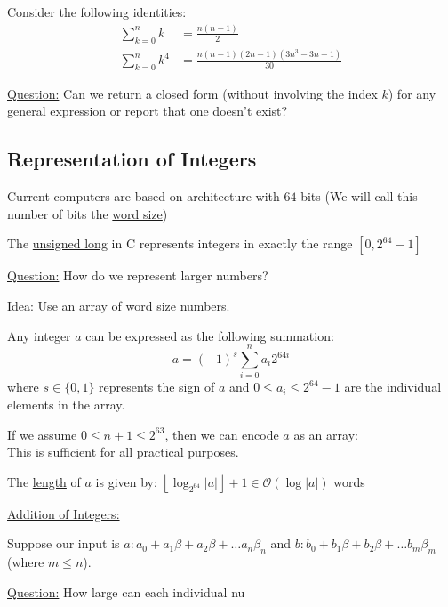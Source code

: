 \begin{example}
    Consider the following identities:
    \begin{align}
        \sum_{k = 0}^n k &= \frac{n(n-1)}{2} \\
        \sum_{k = 0}^n k^4 &= \frac{n(n-1)(2n - 1)(3n^3 - 3n - 1)}{30}
    \end{align}

    \underline{Question:} Can we return a closed form (without involving the index $k$) for any general expression or report that one doesn't exist? 
\end{example}


\subsection{Representation of Integers}
Current computers are based on architecture with $64$ bits (We will call this number of bits the \underline{word size})

\begin{example}
    The \underline{unsigned long} in C represents integers in exactly the range $[0, 2^{64} - 1]$
\end{example}

\underline{Question:} How do we represent larger numbers?

\underline{Idea:} Use an array of word size numbers.

Any integer $a$ can be expressed as the following summation:
\begin{equation}
    a = (-1)^s \sum_{i = 0}^n a_i 2^{64i}
\end{equation}
where $s \in \{0,1\}$ represents the sign of $a$ and $0 \leq a_i \leq 2^{64} - 1$ are the individual elements in the array.

If we assume $0 \leq n + 1 \leq 2^{63}$, then we can encode $a$ as an array:
\begin{equation}
    [s \cdot 2^{63} + n + 1, a_0, a_1, \ldots, a_n]
\end{equation}
This is sufficient for all practical purposes.

\begin{note}
    The \underline{length} of $a$ is given by: $\left\lfloor\log_{2^{64}} |a|\right\rfloor + 1 \in \mathcal{O}\left(\log |a|\right)$ words
\end{note}

\underline{Addition of Integers:}

Suppose our input is $a: a_0 + a_1\beta + a_2\beta + \ldots a_n\beta_n$ and $b: b_0 + b_1\beta + b_2\beta + \ldots b_m\beta_m$ (where $m \leq n$).

\underline{Question:} How large can each individual nu


\clearpage

